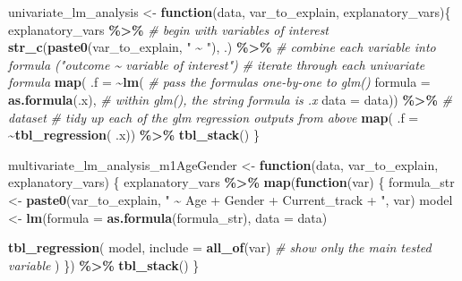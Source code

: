 \documentclass[
]{article}
\newenvironment{Shaded}{\begin{snugshade}}{\end{snugshade}}
\newcommand{\AttributeTok}[1]{\textcolor[rgb]{0.13,0.29,0.53}{#1}}
\newcommand{\CommentTok}[1]{\textcolor[rgb]{0.56,0.35,0.01}{\textit{#1}}}
\newcommand{\ControlFlowTok}[1]{\textcolor[rgb]{0.13,0.29,0.53}{\textbf{#1}}}
\newcommand{\FunctionTok}[1]{\textcolor[rgb]{0.13,0.29,0.53}{\textbf{#1}}}
\newcommand{\NormalTok}[1]{#1}
\newcommand{\OtherTok}[1]{\textcolor[rgb]{0.56,0.35,0.01}{#1}}
\newcommand{\SpecialCharTok}[1]{\textcolor[rgb]{0.81,0.36,0.00}{\textbf{#1}}}
\newcommand{\StringTok}[1]{\textcolor[rgb]{0.31,0.60,0.02}{#1}}
\begin{document}
\begin{Shaded}
\begin{Highlighting}[]
\NormalTok{univariate\_lm\_analysis }\OtherTok{\textless{}{-}}
  \ControlFlowTok{function}\NormalTok{(data, var\_to\_explain, explanatory\_vars)\{}
\NormalTok{    explanatory\_vars }\SpecialCharTok{\%\textgreater{}\%}       \CommentTok{\# begin with variables of interest}
      \FunctionTok{str\_c}\NormalTok{(}\FunctionTok{paste0}\NormalTok{(var\_to\_explain, }\StringTok{" \textasciitilde{} "}\NormalTok{), .) }\SpecialCharTok{\%\textgreater{}\%}         \CommentTok{\# combine each variable into formula ("outcome \textasciitilde{} variable of interest")}
      \CommentTok{\# iterate through each univariate formula}
      \FunctionTok{map}\NormalTok{(                               }
        \AttributeTok{.f =} \SpecialCharTok{\textasciitilde{}}\FunctionTok{lm}\NormalTok{(                       }\CommentTok{\# pass the formulas one{-}by{-}one to glm()}
          \AttributeTok{formula =} \FunctionTok{as.formula}\NormalTok{(.x),      }\CommentTok{\# within glm(), the string formula is .x}
          \AttributeTok{data =}\NormalTok{ data)) }\SpecialCharTok{\%\textgreater{}\%}       \CommentTok{\# dataset}
      \CommentTok{\# tidy up each of the glm regression outputs from above}
      \FunctionTok{map}\NormalTok{(}
        \AttributeTok{.f =} \SpecialCharTok{\textasciitilde{}}\FunctionTok{tbl\_regression}\NormalTok{(}
\NormalTok{          .x)) }\SpecialCharTok{\%\textgreater{}\%}
      \FunctionTok{tbl\_stack}\NormalTok{()}
\NormalTok{  \}}

\NormalTok{multivariate\_lm\_analysis\_m1AgeGender }\OtherTok{\textless{}{-}} \ControlFlowTok{function}\NormalTok{(data, var\_to\_explain, explanatory\_vars) \{}
\NormalTok{  explanatory\_vars }\SpecialCharTok{\%\textgreater{}\%}
    \FunctionTok{map}\NormalTok{(}\ControlFlowTok{function}\NormalTok{(var) \{}
\NormalTok{      formula\_str }\OtherTok{\textless{}{-}} \FunctionTok{paste0}\NormalTok{(var\_to\_explain, }\StringTok{" \textasciitilde{} Age + Gender + Current\_track + "}\NormalTok{, var)}
\NormalTok{      model }\OtherTok{\textless{}{-}} \FunctionTok{lm}\NormalTok{(}\AttributeTok{formula =} \FunctionTok{as.formula}\NormalTok{(formula\_str), }\AttributeTok{data =}\NormalTok{ data)}
      
      \FunctionTok{tbl\_regression}\NormalTok{(}
\NormalTok{        model,}
        \AttributeTok{include =} \FunctionTok{all\_of}\NormalTok{(var)  }\CommentTok{\# show only the main tested variable}
\NormalTok{      )}
\NormalTok{    \}) }\SpecialCharTok{\%\textgreater{}\%}
    \FunctionTok{tbl\_stack}\NormalTok{()}
\NormalTok{\}}



\end{Highlighting}
\end{Shaded}
\end{document}

